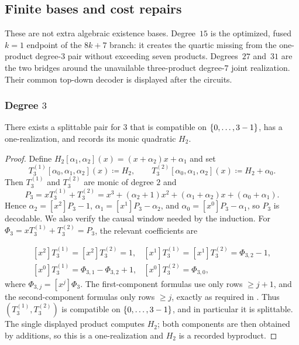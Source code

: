 \subsection{Finite bases and cost repairs}
\label{sec:special-cases}

These are not extra algebraic existence bases.  Degree~$15$ is the optimized,
fused $k=1$ endpoint of the $8k+7$ branch: it creates the quartic missing
from the one-product degree-$3$ pair without exceeding seven products.
Degrees~$27$ and~$31$ are the two bridges around the unavailable
three-product degree-$7$ joint realization.  Their common top-down decoder is
displayed after the circuits.

\subsubsection{Degree \texorpdfstring{$3$}{3}}
\begin{lemma}
    \label{lem:base-three-compatible}
    There exists a splittable pair for $3$ that is compatible on $\{0,\dotsc,3-1\}$,
    has a one-realization, and records its monic quadratic $H_2$.
\end{lemma}
\begin{proof}
    Define $H_2[\alpha_1,\alpha_2](x)=(x+\alpha_2)x+\alpha_1$ and set
    \[
      T^{(1)}_3[\alpha_0,\alpha_1,\alpha_2](x)\coloneqq H_2,\qquad
      T^{(2)}_3[\alpha_0,\alpha_1,\alpha_2](x)\coloneqq H_2+\alpha_0.
    \]
    Then $T^{(1)}_3$ and $T^{(2)}_3$ are monic of degree $2$ and
    \[
      P_3=xT^{(1)}_3+T^{(2)}_3
        =x^3+(\alpha_2+1)x^2+(\alpha_1+\alpha_2)x+(\alpha_0+\alpha_1).
    \]
    Hence $\alpha_2=[x^2]P_3-1$, $\alpha_1=[x^1]P_3-\alpha_2$, and
    $\alpha_0=[x^0]P_3-\alpha_1$, so $P_3$ is decodable.  We also verify
    the causal window needed by the induction.  For
    $\Phi_3=xT^{(1)}_3+T^{(2)}_3=P_3$, the relevant coefficients are

    \[
      \begin{array}{lll}
        [x^2]T^{(1)}_3=[x^2]T^{(2)}_3=1,&
        [x^1]T^{(1)}_3=[x^1]T^{(2)}_3=\Phi_{3,2}-1,\\[2pt]
        [x^0]T^{(1)}_3=\Phi_{3,1}-\Phi_{3,2}+1,&
        [x^0]T^{(2)}_3=\Phi_{3,0},
      \end{array}
    \]
    where $\Phi_{3,j}=[x^j]\Phi_3$.  The first-component formulas use
    only rows $\ge j+1$, and the second-component formulas only rows
    $\ge j$, exactly as required in .  Thus
    $(T^{(1)}_3,T^{(2)}_3)$ is compatible on $\{0,\dotsc,3-1\}$, and in particular it
    is splittable.  The single displayed product computes $H_2$; both
    components are then obtained by additions, so this is a one-realization
    and $H_2$ is a recorded byproduct.
\end{proof}

